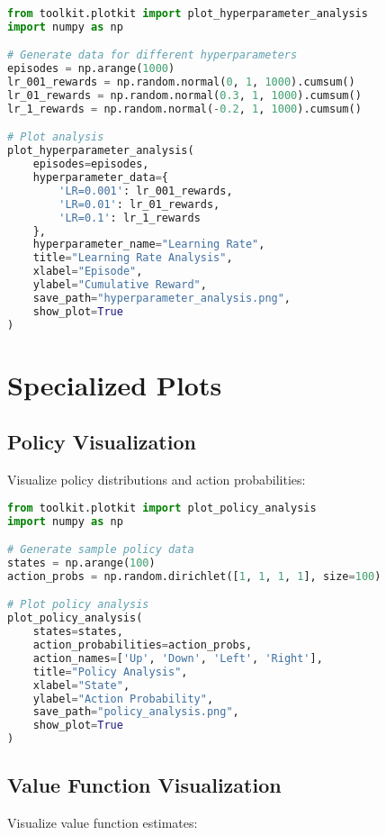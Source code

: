 \begin{lstlisting}[language=python, caption=Hyperparameter Analysis]
from toolkit.plotkit import plot_hyperparameter_analysis
import numpy as np

# Generate data for different hyperparameters
episodes = np.arange(1000)
lr_001_rewards = np.random.normal(0, 1, 1000).cumsum()
lr_01_rewards = np.random.normal(0.3, 1, 1000).cumsum()
lr_1_rewards = np.random.normal(-0.2, 1, 1000).cumsum()

# Plot analysis
plot_hyperparameter_analysis(
    episodes=episodes,
    hyperparameter_data={
        'LR=0.001': lr_001_rewards,
        'LR=0.01': lr_01_rewards,
        'LR=0.1': lr_1_rewards
    },
    hyperparameter_name="Learning Rate",
    title="Learning Rate Analysis",
    xlabel="Episode",
    ylabel="Cumulative Reward",
    save_path="hyperparameter_analysis.png",
    show_plot=True
)
\end{lstlisting}

\section{Specialized Plots}

\subsection{Policy Visualization}

Visualize policy distributions and action probabilities:

\begin{lstlisting}[language=python, caption=Policy Visualization]
from toolkit.plotkit import plot_policy_analysis
import numpy as np

# Generate sample policy data
states = np.arange(100)
action_probs = np.random.dirichlet([1, 1, 1, 1], size=100)

# Plot policy analysis
plot_policy_analysis(
    states=states,
    action_probabilities=action_probs,
    action_names=['Up', 'Down', 'Left', 'Right'],
    title="Policy Analysis",
    xlabel="State",
    ylabel="Action Probability",
    save_path="policy_analysis.png",
    show_plot=True
)
\end{lstlisting}

\subsection{Value Function Visualization}

Visualize value function estimates:

